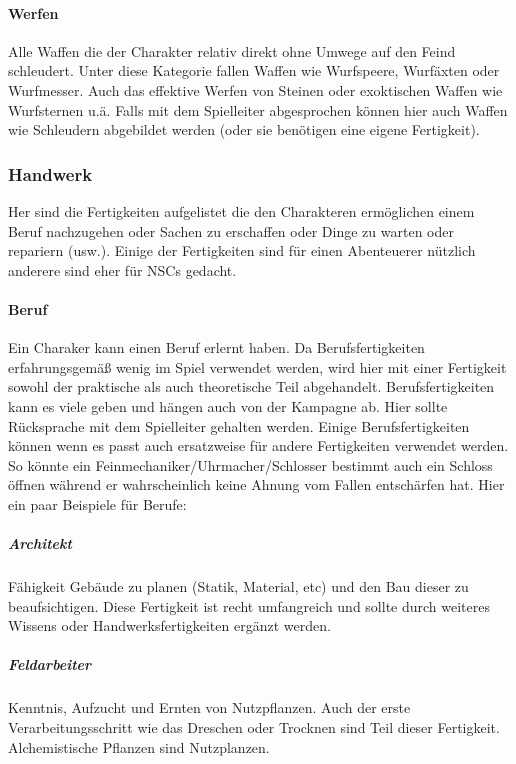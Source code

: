 \documentclass{article}
\begin{document}
\paragraph{Werfen}

Alle Waffen die der Charakter relativ direkt ohne Umwege auf den Feind schleudert. Unter diese Kategorie fallen
Waffen wie Wurfspeere, Wurfäxten oder Wurfmesser. Auch das effektive Werfen von Steinen oder exoktischen Waffen wie
Wurfsternen u.ä. Falls mit dem Spielleiter abgesprochen können hier auch Waffen wie Schleudern abgebildet werden
(oder sie benötigen eine eigene Fertigkeit).

\subsubsection{Handwerk}

Her sind die Fertigkeiten aufgelistet die den Charakteren ermöglichen einem Beruf nachzugehen oder Sachen zu
erschaffen oder Dinge zu warten oder repariern (usw.). Einige der Fertigkeiten sind für einen Abenteuerer nützlich
anderere sind eher für NSCs gedacht.

\paragraph{Beruf}

Ein Charaker kann einen Beruf erlernt haben. Da Berufsfertigkeiten erfahrungsgemäß wenig im Spiel verwendet werden,
wird hier mit einer Fertigkeit sowohl der praktische als auch theoretische Teil abgehandelt. Berufsfertigkeiten kann
es viele geben und hängen auch von der Kampagne ab. Hier sollte Rücksprache mit dem Spielleiter gehalten werden.
Einige Berufsfertigkeiten können wenn es passt auch ersatzweise für andere Fertigkeiten verwendet werden. So könnte
ein Feinmechaniker/Uhrmacher/Schlosser bestimmt auch ein Schloss öffnen während er wahrscheinlich keine Ahnung vom
Fallen entschärfen hat. Hier ein paar Beispiele für Berufe:

\subparagraph{Architekt}

Fähigkeit Gebäude zu planen (Statik, Material, etc) und den Bau dieser zu beaufsichtigen. Diese Fertigkeit ist recht
umfangreich und sollte durch weiteres Wissens oder Handwerksfertigkeiten ergänzt werden.

\subparagraph{Feldarbeiter}

Kenntnis, Aufzucht und Ernten von Nutzpflanzen. Auch der erste Verarbeitungsschritt wie das Dreschen oder Trocknen
sind Teil dieser Fertigkeit. Alchemistische Pflanzen sind Nutzplanzen.
\end{document}
